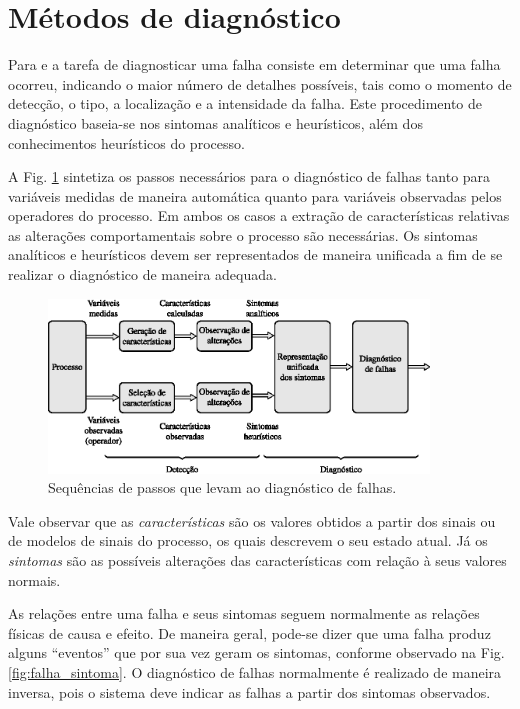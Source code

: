 \section{Métodos de diagnóstico}
Para  e  a tarefa de
diagnosticar uma falha consiste em determinar que uma falha ocorreu, indicando o
maior número de detalhes possíveis, tais como o momento de detecção, o tipo, a
localização e a intensidade da falha. Este procedimento de diagnóstico baseia-se
nos sintomas analíticos e heurísticos, além dos conhecimentos heurísticos do
processo.

A Fig. \ref{fig:diagnostico} sintetiza os passos necessários para o diagnóstico
de falhas tanto para variáveis medidas de maneira automática quanto para
variáveis observadas pelos operadores do processo. Em ambos os casos a extração
de características relativas as alterações comportamentais sobre o processo são
necessárias. Os sintomas analíticos e heurísticos devem ser representados de
maneira unificada a fim de se realizar o diagnóstico de maneira adequada.

\begin{figure}[htb]
\centering
    \includegraphics[width=0.9\textwidth]{imgs/detec_diag/eps/diagnostico}
    \caption{Sequências de passos que levam ao diagnóstico de falhas.}
    \label{fig:diagnostico}
\end{figure}

Vale observar que as {\it características} são os valores obtidos a partir dos
sinais ou de modelos de sinais do processo, os quais descrevem o seu estado
atual. Já os {\it sintomas} são as possíveis alterações das características com
relação à seus valores normais.

As relações entre uma falha e seus sintomas seguem normalmente as relações
físicas de causa e efeito. De maneira geral, pode-se dizer que uma falha produz
alguns ``eventos'' que por sua vez geram os sintomas, conforme observado na Fig.
\ref{fig:falha_sintoma}. O diagnóstico de falhas normalmente é realizado de
maneira inversa, pois o sistema deve indicar as falhas a partir dos sintomas
observados.

